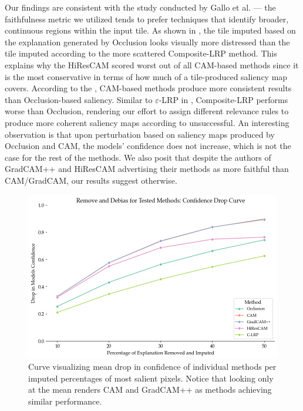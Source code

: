 Our findings are consistent with the study conducted by Gallo et al. \cite{gallo} --- the faithfulness metric we utilized tends to prefer techniques that identify broader, continuous regions within the input tile.
As shown in , the tile imputed based on the explanation generated by Occlusion looks visually more distressed than the tile imputed according to the more scattered Composite-LRP method.
This explains why the HiResCAM scored worst out of all CAM-based methods since it is the most conservative in terms of how much of a tile-produced saliency map covers.
According to the , CAM-based methods produce more consistent results than Occlusion-based saliency.
Similar to $\varepsilon$-LRP in \cite{gallo}, Composite-LRP performs worse than Occlusion, rendering our effort to assign different relevance rules to produce more coherent saliency maps according to \cite{lrp} unsuccessful.
An interesting observation is that upon perturbation based on saliency maps produced by Occlusion and CAM, the models' confidence does not increase, which is not the case for the rest of the methods.
We also posit that despite the authors of GradCAM++ and HiResCAM \cite{grad-cam, hires-cam} advertising their methods as more faithful than CAM/GradCAM, our results suggest otherwise.

\begin{figure}
    \begin{center}
    \begin{minipage}{1\textwidth}
      \includegraphics[width=\textwidth]{img/road-curve.png}
    \end{minipage}
    \caption{Curve visualizing mean drop in confidence of individual methods per imputed percentages of most salient pixels. Notice that looking only at the mean renders CAM and GradCAM++ as methods achieving similar performance.}
    \label{fig:road-curve}
    \end{center}
\end{figure}

